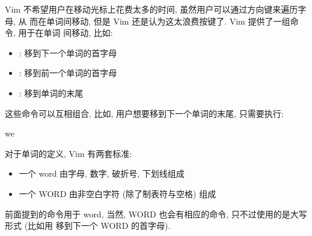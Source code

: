 Vim 不希望用户在移动光标上花费太多的时间, 虽然用户可以通过方向键来遍历字母, 从
而在单词间移动, 但是 Vim 还是认为这太浪费按键了. Vim 提供了一组命令, 用于在单词
间移动, 比如:
\begin{itemize}
    \item {}: 移到下一个单词的首字母
    \item {}: 移到前一个单词的首字母
    \item {}: 移到单词的末尾
\end{itemize}
这些命令可以互相组合, 比如, 用户想要移到下一个单词的末尾, 只需要执行:
\begin{vimcmd}
we
\end{vimcmd}

对于单词的定义, Vim 有两套标准:
\begin{itemize}
    \item 一个 word 由字母, 数字, 破折号, 下划线组成
    \item 一个 WORD 由非空白字符 (除了制表符与空格) 组成
\end{itemize}
前面提到的命令用于 word, 当然, WORD 也会有相应的命令, 只不过使用的是大写形式
(比如用  移到下一个 WORD 的首字母).
